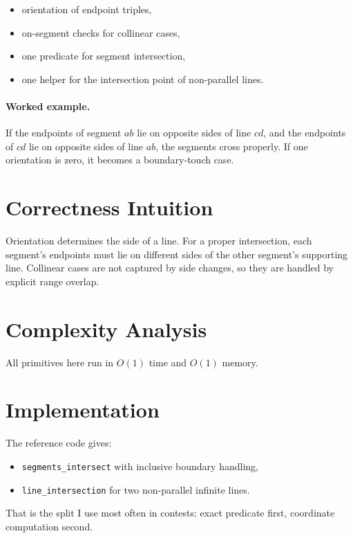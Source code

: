 \begin{itemize}
  \item orientation of endpoint triples,
  \item on-segment checks for collinear cases,
  \item one predicate for segment intersection,
  \item one helper for the intersection point of non-parallel lines.
\end{itemize}

\paragraph{Worked example.}
If the endpoints of segment \(ab\) lie on opposite sides of line \(cd\), and the endpoints of \(cd\) lie on opposite
sides of line \(ab\), the segments cross properly. If one orientation is zero, it becomes a boundary-touch case.

\section*{Correctness Intuition}

Orientation determines the side of a line. For a proper intersection, each segment's endpoints must lie on different
sides of the other segment's supporting line. Collinear cases are not captured by side changes, so they are handled by
explicit range overlap.

\section*{Complexity Analysis}

All primitives here run in \(O(1)\) time and \(O(1)\) memory.

\section*{Implementation}

The reference code gives:

\begin{itemize}
  \item \texttt{segments\_intersect} with inclusive boundary handling,
  \item \texttt{line\_intersection} for two non-parallel infinite lines.
\end{itemize}

That is the split I use most often in contests: exact predicate first, coordinate computation second.

